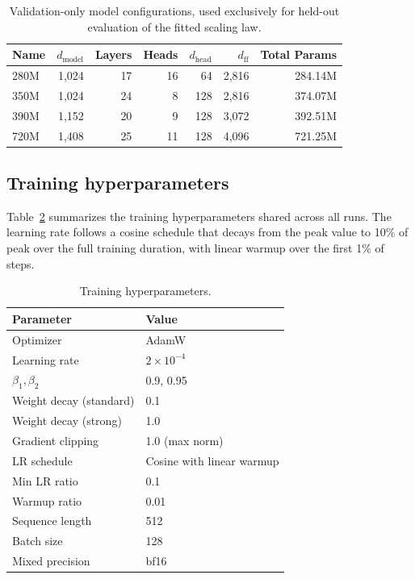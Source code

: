 \begin{table}[t]
\centering
\caption{Validation-only model configurations, used exclusively for held-out evaluation of the fitted scaling law.}
\label{tab:validation_models}
\small
\begin{tabular}{lrrrrrr}
\toprule
Name & $d_\text{model}$ & Layers & Heads & $d_\text{head}$ & $d_\text{ff}$ & Total Params\\
\midrule
280M & 1,024 & 17 & 16 & 64  & 2,816 & 284.14M \\
350M & 1,024 & 24 & 8  & 128 & 2,816 & 374.07M \\
390M & 1,152 & 20 & 9  & 128 & 3,072 & 392.51M \\
720M & 1,408 & 25 & 11 & 128 & 4,096 & 721.25M \\
\bottomrule
\end{tabular}
\end{table}

\subsection{Training hyperparameters}

Table~\ref{tab:hyperparams} summarizes the training hyperparameters shared across all runs. The learning rate follows a cosine schedule that decays from the peak value to 10\% of peak over the full training duration, with linear warmup over the first 1\% of steps.

\begin{table}[t]
\centering
\caption{Training hyperparameters.}
\label{tab:hyperparams}
\begin{tabular}{ll}
\toprule
Parameter & Value \\
\midrule
Optimizer & AdamW \\
Learning rate & $2 \times 10^{-4}$ \\
$\beta_1, \beta_2$ & 0.9, 0.95 \\
Weight decay (standard) & 0.1 \\
Weight decay (strong) & 1.0 \\
Gradient clipping & 1.0 (max norm) \\
LR schedule & Cosine with linear warmup \\
Min LR ratio & 0.1 \\
Warmup ratio & 0.01 \\
Sequence length & 512 \\
Batch size & 128 \\
Mixed precision & bf16 \\
\bottomrule
\end{tabular}
\end{table}

